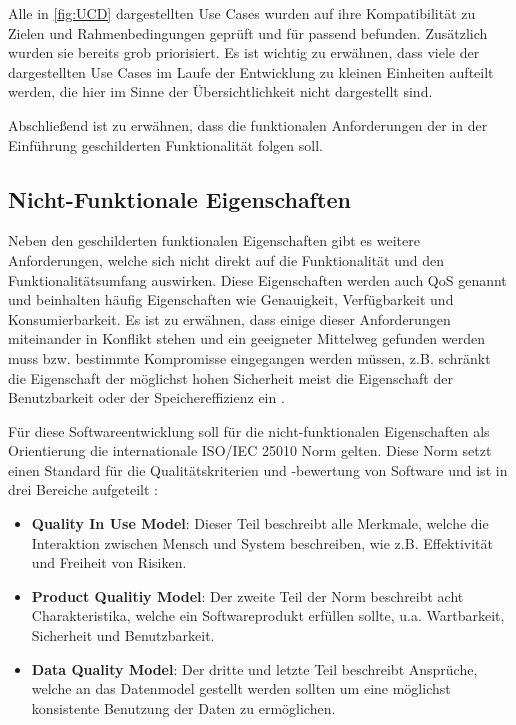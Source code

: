 \vspace{0.25cm}

 
Alle in \autoref{fig:UCD} dargestellten Use Cases wurden auf ihre Kompatibilität zu Zielen und Rahmenbedingungen geprüft und für passend befunden. Zusätzlich wurden sie bereits grob priorisiert. Es ist wichtig zu erwähnen, dass viele der dargestellten Use Cases im Laufe der Entwicklung zu kleinen Einheiten aufteilt werden, die hier im Sinne der Übersichtlichkeit nicht dargestellt sind.



Abschließend ist zu erwähnen, dass die funktionalen Anforderungen der in der Einführung geschilderten Funktionalität folgen soll.

\subsection{Nicht-Funktionale Eigenschaften}
Neben den geschilderten funktionalen Eigenschaften gibt es weitere Anforderungen, welche sich nicht direkt auf die Funktionalität und den Funktionalitätsumfang auswirken. Diese Eigenschaften werden auch \ac{QoS} genannt und beinhalten häufig Eigenschaften wie  Genauigkeit, Verfügbarkeit und  Konsumierbarkeit. Es ist zu erwähnen, dass einige dieser Anforderungen miteinander in Konflikt stehen und ein geeigneter Mittelweg gefunden werden muss bzw. bestimmte Kompromisse eingegangen werden müssen, z.B. schränkt die Eigenschaft der möglichst hohen Sicherheit meist die Eigenschaft der Benutzbarkeit oder der Speichereffizienz ein \cite{Balzert.2009}.  

\vspace{0.25cm}

Für diese Softwareentwicklung soll für die nicht-funktionalen Eigenschaften als Orientierung die internationale ISO/IEC 25010 Norm gelten. Diese Norm setzt einen Standard für die Qualitätskriterien und -bewertung von Software und ist in drei Bereiche aufgeteilt \cite{ISO.2011} \cite{Braun.2016}:

\begin{itemize}
	\item \textbf{Quality In Use Model}: Dieser Teil beschreibt alle Merkmale, welche die Interaktion zwischen Mensch und System beschreiben, wie z.B. Effektivität und Freiheit von Risiken.
	\item \textbf{Product Qualitiy Model}: Der zweite Teil der Norm beschreibt acht Charakteristika, welche ein Softwareprodukt erfüllen sollte, u.a. Wartbarkeit, Sicherheit und Benutzbarkeit.
	\item \textbf{Data Quality Model}: Der dritte und letzte Teil beschreibt Ansprüche, welche an das Datenmodel gestellt werden sollten um eine möglichst konsistente Benutzung der Daten zu ermöglichen.
\end{itemize}

